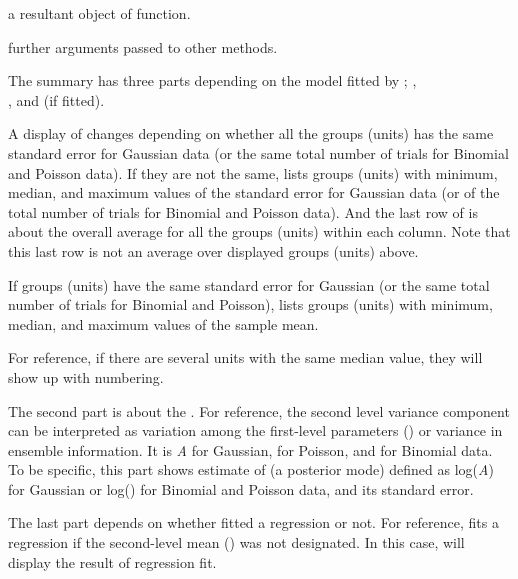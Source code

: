 \documentclass[a4paper]{book}
\begin{document}
%
\begin{Arguments}
\begin{ldescription}
\item[\code{x}] 
a resultant object of  function. 

\item[\code{...}] 
further arguments passed to other methods.

\end{ldescription}
\end{Arguments}
%
\begin{Details}\relax
The summary has three parts depending on the model fitted by ; , \\{}, and  (if fitted).

A display of  changes depending on whether all the groups (units) has the same standard error for Gaussian data (or the same total number of trials for Binomial and Poisson data). If they are not the same, 
 lists groups (units) with minimum, median, and maximum values of the standard error for Gaussian data (or of the total number of trials for Binomial and Poisson data). And the last row of  is about the overall average for all the groups (units) within each column. Note that this last row is not an average over displayed groups (units) above.

If groups (units) have the same standard error for Gaussian (or the same total number of trials for Binomial and Poisson),  lists groups (units) with minimum, median, and maximum values of the sample mean. 

For reference, if there are several units with the same median value, they will show up with numbering.

The second part is about the . For reference, the second level variance component can be interpreted as variation among the first-level parameters () or variance in ensemble information. It is \emph{A} for Gaussian,  for Poisson, and  for Binomial data. To be specific, this part shows estimate of \eqn{\alpha}{} (a posterior mode) defined as log(\emph{A}) for Gaussian or log() for Binomial and Poisson data, and its standard error. 

The last part depends on whether  fitted a regression or not. For reference,  fits a regression if the second-level mean () was not designated. In this case,  will display the result of regression fit.

\end{Details}
\end{document}
